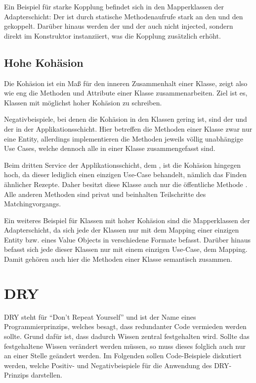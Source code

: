 Ein Beispiel für starke Kopplung befindet sich in den Mapperklassen der Adapterschicht: Der  ist durch statische Methodenaufrufe stark an den  und den  gekoppelt. Darüber hinaus werden der  und der  auch nicht injected, sondern direkt im Konstruktor instanziiert, was die Kopplung zusätzlich erhöht.

\subsection{Hohe Kohäsion}
Die Kohäsion ist ein Maß für den inneren Zusammenhalt einer Klasse, zeigt also wie eng die Methoden und Attribute einer Klasse zusammenarbeiten. Ziel ist es, Klassen mit möglichst hoher Kohäsion zu schreiben.

Negativbeispiele, bei denen die Kohäsion in den Klassen gering ist, sind der  und der  in der Applikationsschicht. Hier betreffen die Methoden einer Klasse zwar nur eine Entity, allerdings implementieren die Methoden jeweils völlig unabhängige Use Cases, welche dennoch alle in einer Klasse zusammengefasst sind.

Beim dritten Service der Applikationsschicht, dem , ist die Kohäsion hingegen hoch, da dieser lediglich einen einzigen Use-Case behandelt, nämlich das Finden ähnlicher Rezepte. Daher besitzt diese Klasse auch nur die öffentliche Methode . Alle anderen Methoden sind privat und beinhalten Teilschritte des Matchingvorgangs.

Ein weiteres Beispiel für Klassen mit hoher Kohäsion sind die Mapperklassen der Adapterschicht, da sich jede der Klassen nur mit dem Mapping einer einzigen Entity bzw. eines Value Objects in verschiedene Formate befasst. Darüber hinaus befasst sich jede dieser Klassen nur mit einem einzigen Use-Case, dem Mapping. Damit gehören auch hier die Methoden einer Klasse semantisch zusammen.

\section{DRY}
DRY steht für \enquote{Don't Repeat Yourself} und ist der Name eines Programmierprinzips, welches besagt, dass redundanter Code vermieden werden sollte. Grund dafür ist, dass dadurch Wissen zentral festgehalten wird. Sollte das festgehaltene Wissen verändert werden müssen, so muss dieses folglich auch nur an einer Stelle geändert werden. Im Folgenden sollen Code-Beispiele diskutiert werden, welche Positiv- und Negativbeispiele für die Anwendung des DRY-Prinzips darstellen.

